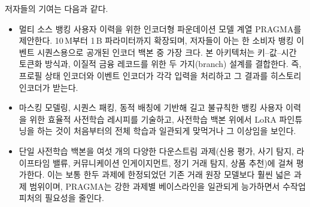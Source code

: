 저자들의 기여는 다음과 같다.
\begin{itemize}
    \item 멀티 소스 뱅킹 사용자 이력을 위한 인코더형 파운데이션 모델 계열 PRAGMA를 제안한다. 10\,M부터 1\,B 파라미터까지 확장되며, 저자들이 아는 한 소비자 뱅킹 이벤트 시퀀스용으로 공개된 인코더 백본 중 가장 크다. 본 아키텍처는 키--값--시간 토큰화 방식과, 이질적 금융 레코드를 위한 두 가지(branch) 설계를 결합한다. 즉, 프로필 상태 인코더와 이벤트 인코더가 각각 입력을 처리하고 그 결과를 히스토리 인코더가 받는다.
    \item 마스킹 모델링, 시퀀스 패킹, 동적 배칭에 기반해 길고 불규칙한 뱅킹 사용자 이력을 위한 효율적 사전학습 레시피를 기술하고, 사전학습 백본 위에서 LoRA 파인튜닝을 하는 것이 처음부터의 전체 학습과 일관되게 맞먹거나 그 이상임을 보인다.
    \item 단일 사전학습 백본을 여섯 개의 다양한 다운스트림 과제(신용 평가, 사기 탐지, 라이프타임 밸류, 커뮤니케이션 인게이지먼트, 정기 거래 탐지, 상품 추천)에 걸쳐 평가한다. 이는 보통 한두 과제에 한정되었던 기존 거래 원장 모델보다 훨씬 넓은 과제 범위이며, PRAGMA는 강한 과제별 베이스라인을 일관되게 능가하면서 수작업 피처의 필요성을 줄인다.
\end{itemize}
